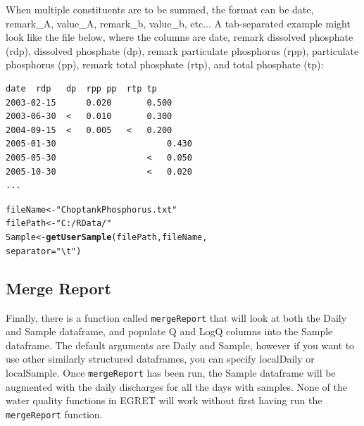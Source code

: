 \documentclass[a4paper,11pt]{article}\usepackage[]{graphicx}\usepackage[]{color}
\makeatletter
\newcommand{\hlstr}[1]{\textcolor[rgb]{0.192,0.494,0.8}{#1}}%
\newcommand{\hlstd}[1]{\textcolor[rgb]{0.345,0.345,0.345}{#1}}%
\newcommand{\hlkwb}[1]{\textcolor[rgb]{0.69,0.353,0.396}{#1}}%
\newcommand{\hlkwc}[1]{\textcolor[rgb]{0.333,0.667,0.333}{#1}}%
\newcommand{\hlkwd}[1]{\textcolor[rgb]{0.737,0.353,0.396}{\textbf{#1}}}%
\newenvironment{kframe}{%
 \def\at@end@of@kframe{}%
 \ifinner\ifhmode%
  \def\at@end@of@kframe{\end{minipage}}%
  \begin{minipage}{\columnwidth}%
 \fi\fi%
 \def\FrameCommand##1{\hskip\@totalleftmargin \hskip-\fboxsep
 \colorbox{shadecolor}{##1}\hskip-\fboxsep
     \hskip-\linewidth \hskip-\@totalleftmargin \hskip\columnwidth}%
 \MakeFramed {\advance\hsize-\width
   \@totalleftmargin\z@ \linewidth\hsize
   \@setminipage}}%
 {\par\unskip\endMakeFramed%
 \at@end@of@kframe}
\newenvironment{knitrout}{}{} %
\makeatother
\begin{document}
When multiple constituents are to be summed, the format can be date, remark\_A, value\_A, remark\_b, value\_b, etc... A tab-separated example might look like the file below, where the columns are date, remark dissolved phosphate (rdp), dissolved phosphate (dp), remark particulate phosphorus (rpp), particulate phosphorus (pp), remark total phosphate (rtp), and total phosphate (tp):

\singlespacing
\begin{verbatim}
date  rdp	dp	rpp	pp	rtp	tp
2003-02-15		0.020		0.500		
2003-06-30	<	0.010		0.300		
2004-09-15	<	0.005	<	0.200		
2005-01-30						0.430
2005-05-30					<	0.050
2005-10-30					<	0.020
...
\end{verbatim}


\begin{knitrout}
\color{fgcolor}\begin{kframe}
\begin{alltt}
\hlstd{fileName} \hlkwb{<-} \hlstr{"ChoptankPhosphorus.txt"}
\hlstd{filePath} \hlkwb{<-}  \hlstr{"C:/RData/"}
\hlstd{Sample} \hlkwb{<-}\hlkwd{getUserSample}\hlstd{(filePath,fileName,}
                                \hlkwc{separator}\hlstd{=}\hlstr{"\textbackslash{}t"}\hlstd{)}
\end{alltt}
\end{kframe}
\end{knitrout}


\FloatBarrier

\subsection{Merge Report}
Finally, there is a function called \texttt{mergeReport} that will look at both the Daily and Sample dataframe, and populate Q and LogQ columns into the Sample dataframe. The default arguments are Daily and Sample, however if you want to use other similarly structured dataframes, you can specify localDaily or localSample. Once \texttt{mergeReport} has been run, the Sample dataframe will be augmented with the daily discharges for all the days with samples.  None of the water quality functions in EGRET will work without first having run the \texttt{mergeReport} function.
\end{document}
